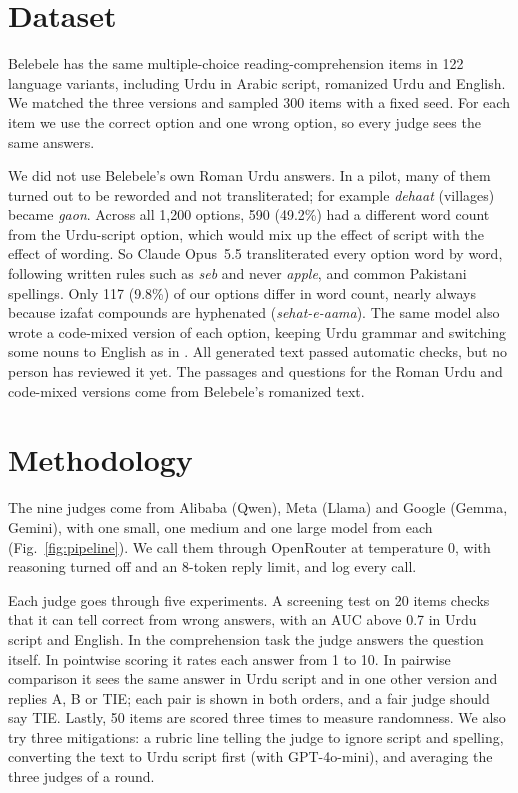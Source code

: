 \documentclass[conference]{IEEEtran}
\newcommand{\rom}[1]{\textit{#1}}  %
\begin{document}


\section{Dataset}
\label{sec:data}
Belebele \cite{bandarkar2024belebele} has the same multiple-choice reading-comprehension items in 122 language
variants, including Urdu in Arabic script, romanized Urdu and English. We matched the three versions and sampled 300
items with a fixed seed. For each item we use the correct option and one wrong option, so every judge sees the same
answers.

We did not use Belebele's own Roman Urdu answers. In a pilot, many of them turned out to be reworded and not
transliterated; for example \rom{dehaat} (villages) became \rom{gaon}. Across all 1{,}200 options, 590 (49.2\%) had a
different word count from the Urdu-script option, which would mix up the effect of script with the effect of wording.
So Claude Opus~5.5 transliterated every option word by word, following written rules such as \rom{seb} and never
\rom{apple}, and common Pakistani spellings. Only 117 (9.8\%) of our options differ in word count, nearly always because
izafat compounds are hyphenated (\rom{sehat-e-aama}). The same model also wrote a code-mixed version of each option,
keeping Urdu grammar and switching some nouns to English as in \cite{mohamed2025lost}. All generated text passed
automatic checks, but no person has reviewed it yet. The passages and questions for the Roman Urdu and code-mixed
versions come from Belebele's romanized text.

\section{Methodology}
\label{sec:method}
The nine judges come from Alibaba (Qwen), Meta (Llama) and Google (Gemma, Gemini), with one small, one medium and one
large model from each (Fig.~\ref{fig:pipeline}). We call them through OpenRouter at temperature 0, with reasoning
turned off and an 8-token reply limit, and log every call.

Each judge goes through five experiments. A screening test on 20 items checks that it can tell correct from wrong
answers, with an AUC above 0.7 in Urdu script and English. In the comprehension task the judge answers the question
itself. In pointwise scoring it rates each answer from 1 to 10. In pairwise comparison it sees the same answer in Urdu
script and in one other version and replies A, B or TIE; each pair is shown in both orders, and a fair judge should say
TIE. Lastly, 50 items are scored three times to measure randomness. We also try three mitigations: a rubric line telling
the judge to ignore script and spelling, converting the text to Urdu script first (with GPT-4o-mini), and averaging the
three judges of a round.
\end{document}
